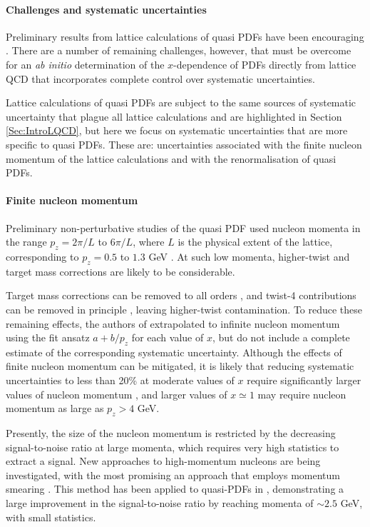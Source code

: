 \paragraph*{Challenges and systematic uncertainties} Preliminary results from lattice calculations of quasi PDFs have been encouraging \cite{Lin:2014zya,Alexandrou:2015rja,Chen:2016utp,Alexandrou:2016jqi}. There are a number of remaining challenges, however, that must be overcome for an {\it ab initio} determination of the $x$-dependence of PDFs directly from lattice QCD that incorporates complete control over systematic uncertainties.

Lattice calculations of quasi PDFs are subject to the same sources of systematic uncertainty that plague all lattice calculations and are highlighted in Section \ref{Sec:IntroLQCD}, but here we focus on systematic uncertainties that are more specific to quasi PDFs. These are: uncertainties associated with the finite nucleon momentum of the lattice calculations and with the renormalisation of quasi PDFs.

\paragraph*{Finite nucleon momentum} Preliminary non-perturbative studies of the quasi PDF used nucleon momenta in the range $p_z = 2\pi/L$ to $6\pi/L$, where $L$ is the physical extent of the lattice, corresponding to $p_z = 0.5$ to $1.3$ GeV  \cite{Lin:2014zya,Alexandrou:2015rja,Chen:2016utp}. At such low momenta, higher-twist and target mass corrections are likely to be considerable.

Target mass corrections can be removed to all orders \cite{Chen:2016utp}, and twist-4 contributions can be removed in principle \cite{Radyushkin:2016hsy,Chen:2016utp}, leaving higher-twist contamination. To reduce these remaining effects, the authors of \cite{Lin:2014zya,Chen:2016utp} extrapolated to infinite nucleon momentum using the fit ansatz $a + b/p_z$ for each value of $x$, but do not include a complete estimate of the corresponding systematic uncertainty. Although the effects of finite nucleon momentum can be mitigated, it is likely that reducing systematic uncertainties to less than 20\% at moderate values of $x$ require significantly larger values of nucleon momentum \cite{Gamberg:2014zwa}, and larger values of $x\simeq 1$ may require nucleon momentum as large as $p_z > 4$ GeV.

Presently, the size of the nucleon momentum is restricted by the decreasing signal-to-noise ratio at large momenta, which requires very high statistics to extract a signal. New approaches to high-momentum nucleons are being investigated, with the most promising an approach that employs momentum smearing \cite{Bali:2016lva}. This method has been applied to quasi-PDFs in \cite{Alexandrou:2016jqi}, demonstrating a large improvement in the signal-to-noise ratio by reaching momenta of $\sim 2.5$ GeV, with small statistics.

